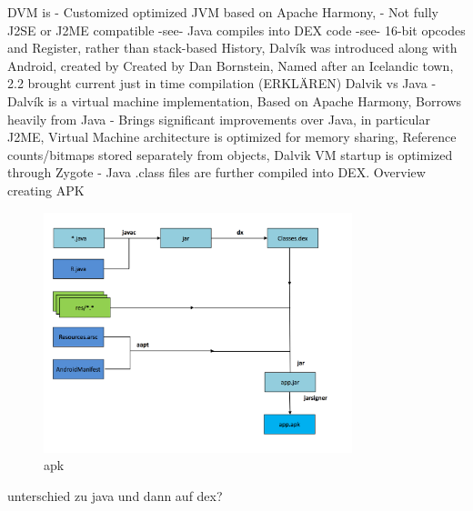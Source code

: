 %
DVM is
- Customized optimized JVM based on Apache Harmony,
- Not fully J2SE or J2ME compatible -see- Java compiles into DEX code -see- 16-bit opcodes and Register, rather than stack-based\newline
History, Dalvík was introduced along with Android, created by Created by Dan Bornstein, Named after an Icelandic town, 2.2 brought current just in time compilation (ERKLÄREN)\newline
Dalvik vs Java
- Dalvík is a virtual machine implementation, Based on Apache Harmony, Borrows heavily from Java
- Brings significant improvements over Java, in particular J2ME, Virtual Machine architecture is optimized for memory sharing, Reference counts/bitmaps stored separately from objects, Dalvik VM startup is optimized through Zygote
- Java .class files are further compiled into DEX.\newline
Overview creating APK
\begin{figure}[h]
    \centering
    \includegraphics[width=0.8\textwidth]{data/apk.png}
    \caption{apk}
    \label{fig:apk}
\end{figure}
unterschied zu java und dann auf dex?\newline
\cite{andevconDalvikART}
%
